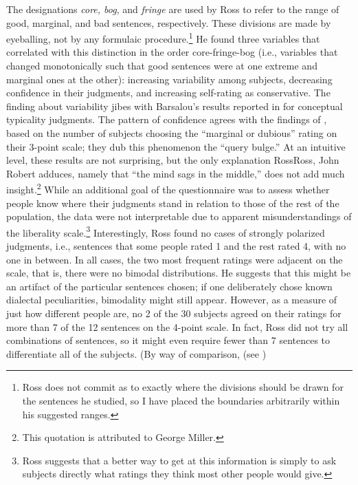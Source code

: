 The designations \textit{core, bog}, and \textit{fringe} are used by Ross to refer to the range of good, marginal, and bad sentences, respectively. These divisions are made by eyeballing, not by any formulaic procedure.\footnote{Ross does not commit as to exactly where the divisions should be drawn for the sentences he studied, so I have placed the boundaries arbitrarily within his suggested ranges.}
 He found three variables that correlated with this distinction in the order core-fringe-bog (i.e., variables that changed monotonically such that good sentences were at one extreme and marginal ones at the other): increasing variability among subjects, decreasing confidence in their judgments, and increasing self-rating as conservative. The finding about variability jibes with Barsalou's results reported in  for conceptual typicality judgments. The pattern of confidence agrees with the findings of \citet[52, fig. 9]{QuirkEtAl1966}, based on the number of subjects choosing the ``marginal or dubious'' rating on their 3-point scale; they dub this phenomenon the ``query bulge.'' At an intuitive level, these results are not surprising, but the only explanation Ross{Ross, John Robert} adduces, namely that ``the mind sags in the middle,'' does not add much insight.\footnote{This quotation is attributed to George Miller.}
 While an additional goal of the questionnaire was to assess whether people know where their judgments stand in relation to those of the rest
of the population, the data were not interpretable due to apparent misunderstandings of the liberality scale.\footnote{Ross suggests that a better way to get at this information is simply to ask subjects directly what ratings they think most other people would give.}
 Interestingly, Ross found no cases of strongly polarized judgments, i.e., sentences that some people rated 1 and the rest rated 4, with no one in between. In all cases, the two most frequent ratings were adjacent on the scale, that is, there were no bimodal distributions. He suggests that this might be an artifact of the particular sentences chosen; if one deliberately chose known dialectal peculiarities, bimodality might still appear. However, as a measure of just how different people are, no 2 of the 30 subjects agreed on their ratings for more than 7 of the 12 sentences on the 4-point scale. In fact, Ross did not try all combinations of sentences, so it might even require fewer than 7 sentences to differentiate all of the subjects. (By way of comparison, \citet{QuirkEtAl1966} (see )
